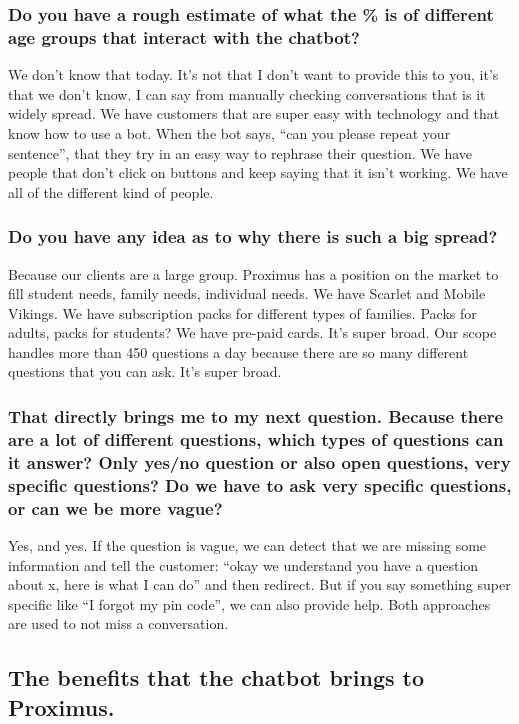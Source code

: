 \begin{appendices}
	\subsubsection{Do you have a rough estimate of what the \% is of different age groups that interact with the chatbot?}
	We don’t know that today. It’s not that I don’t want to provide this to you, it’s that we don’t know. I can say from manually checking conversations that is it widely spread. We have customers that are super easy with technology and that know how to use a bot. When the bot says, “can you please repeat your sentence”, that they try in an easy way to rephrase their question. We have people that don’t click on buttons and keep saying that it isn’t working. We have all of the different kind of people.
	
	\subsubsection{Do you have any idea as to why there is such a big spread?}
	Because our clients are a large group. Proximus has a position on the market to fill student needs, family needs, individual needs. We have Scarlet and Mobile Vikings. We have subscription packs for different types of families. Packs for adults, packs for students? We have pre-paid cards. It’s super broad. Our scope handles more than 450 questions a day because there are so many different questions that you can ask. It’s super broad.
	
	\subsubsection{That directly brings me to my next question. Because there are a lot of different questions, which types of questions can it answer? Only yes/no question or also open questions, very specific questions? Do we have to ask very specific questions, or can we be more vague?}
	Yes, and yes. If the question is vague, we can detect that we are missing some information and tell the customer: “okay we understand you have a question about x, here is what I can do” and then redirect. But if you say something super specific like “I forgot my pin code”, we can also provide help. Both approaches are used to not miss a conversation.
	
	\subsection{The benefits that the chatbot brings to Proximus.}

\end{appendices}
